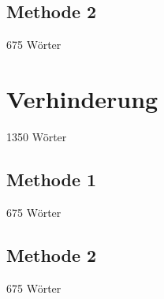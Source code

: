 \subsection{Methode 2}
\label{subsection:Method2} 675 Wörter

\section{Verhinderung} 1350 Wörter
\label{section:Prevention}

\subsection{Methode 1}
\label{subsection:Method1} 675 Wörter

\subsection{Methode 2}
\label{subsection:Method2} 675 Wörter
